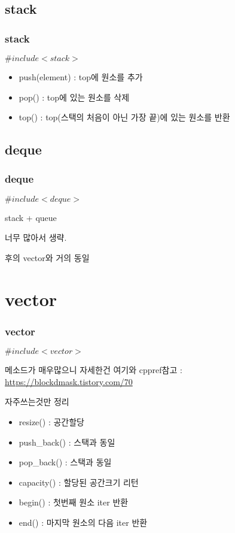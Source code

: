 \documentclass[10pt]{beamer}
\begin{document}
\subsection{stack}


\begin{frame}
    \frametitle{stack}
    $\#include<stack>$
    \begin{itemize}
        \item push(element) : top에 원소를 추가
        \item pop() : top에 있는 원소를 삭제
        \item top() : top(스택의 처음이 아닌 가장 끝)에 있는 원소를 반환
    \end{itemize}
\end{frame}


\subsection{deque}

\begin{frame}
    \frametitle{deque}

    $\#include<deque>$
    
    stack  + queue
    
    너무 많아서 생략.

    후의 vector와 거의 동일
\end{frame}




\section{vector}

\begin{frame}    
    \frametitle{vector}
    $\#include<vector>$

    메소드가 매우많으니 자세한건 여기와 cppref참고 : \url{https://blockdmask.tistory.com/70}
    
    자주쓰는것만 정리
    
    \begin{itemize}
        \item resize() : 공간할당
        \item push\_back() : 스택과 동일 
        \item pop\_back() : 스택과 동일
        \item capacity() : 할당된 공간크기 리턴 
        \item begin() : 첫번째 원소 iter 반환
        \item end() : 마지막 원소의 다음 iter 반환
    \end{itemize}

\end{frame}
\end{document}
